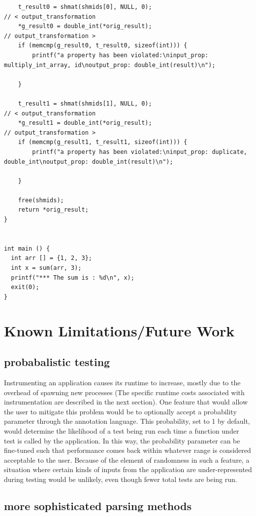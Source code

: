 \documentclass[notitlepage]{article}
\begin{document}
\begin{verbatim}
    t_result0 = shmat(shmids[0], NULL, 0);
// < output_transformation
    *g_result0 = double_int(*orig_result);
// output_transformation >
    if (memcmp(g_result0, t_result0, sizeof(int))) {
        printf("a property has been violated:\ninput_prop: multiply_int_array, id\noutput_prop: double_int(result)\n");

    }

    t_result1 = shmat(shmids[1], NULL, 0);
// < output_transformation
    *g_result1 = double_int(*orig_result);
// output_transformation >
    if (memcmp(g_result1, t_result1, sizeof(int))) {
        printf("a property has been violated:\ninput_prop: duplicate, double_int\noutput_prop: double_int(result)\n");

    }

    free(shmids);
    return *orig_result;
}


int main () {
  int arr [] = {1, 2, 3};
  int x = sum(arr, 3);
  printf("*** The sum is : %d\n", x);
  exit(0);
}
\end{verbatim}

\section{Known Limitations/Future Work}

\subsection{probabalistic testing}

Instrumenting an application causes its runtime to increase, mostly due to the overhead of spawning new processes (The specific runtime costs associated with instrumentation are described in the next section). One feature that would allow the user to mitigate this problem would be to optionally accept a probability parameter through the annotation language. This probability, set to 1 by default, would determine the likelihood of a test being run each time a function under test is called by the application. In this way, the probability parameter can be fine-tuned such that performance comes back within whatever range is considered acceptable to the user. Because of the element of randomness in such a feature, a situation where certain kinds of inputs from the application are under-represented during testing would be unlikely, even though fewer total tests are being run.

\subsection{more sophisticated parsing methods}
\end{document}
